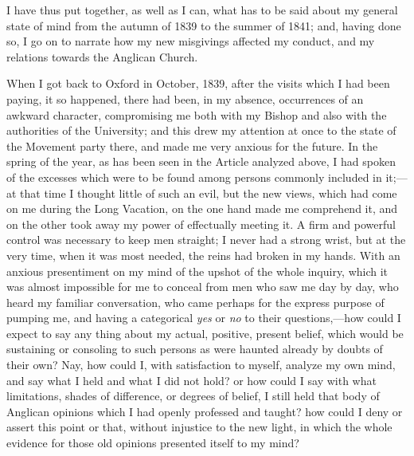 I have thus put together, as well as I can, what has to
be said about my general state of mind from the autumn of 1839 to the
summer of 1841; and, having done so, I go on to narrate how my new
misgivings affected my conduct, and my relations towards the Anglican
Church.

When I got back to Oxford in October, 1839, after the visits which I
had been paying, it so happened, there had been, in my absence,
occurrences of an awkward character, compromising me both with my Bishop and also with the
authorities of the
University; and this drew my attention at once to the
state of the Movement party there, and made
me very anxious for the future. In the spring of the year, as has been
seen in the Article analyzed above, I had spoken of the excesses which
were to be found among persons commonly included in it;—at that
time I thought little of such an evil, but the new views,
which had come on me during the Long Vacation, on the one hand made me
comprehend it, and on the other took away my power of effectually
meeting it. A firm and powerful control was necessary to keep men
straight; I never had a strong wrist, but at the very time, when it was
most needed, the reins had broken in my hands. With an anxious
presentiment on my mind of the upshot of the whole inquiry, which it was
almost impossible for me to conceal from men who saw me day by day, who
heard my familiar conversation, who came perhaps for the express purpose
of pumping me, and having a categorical \emph{yes} or \emph{no} to their
questions,—how could I expect to say any thing about my actual,
positive, present belief, which would be sustaining or consoling to such
persons as were haunted already by doubts of their own? Nay, how could
I, with satisfaction to myself, analyze my own mind, and say what I held
and what I did not hold? or how could I say with what
limitations, shades of difference, or degrees of belief, I still
held that body of Anglican opinions which I had openly professed
and taught? how could I deny or assert this point or that, without
injustice to the new light, in which the whole evidence for
those old opinions presented itself to my mind?

